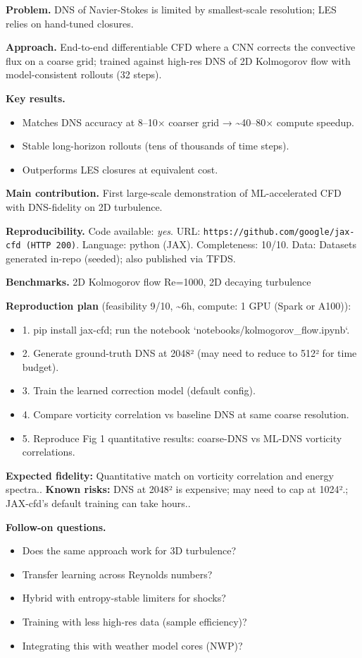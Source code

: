 \documentclass[10pt,letterpaper]{article}
\begin{document}
\textbf{Problem.} DNS of Navier-Stokes is limited by smallest-scale resolution; LES relies on hand-tuned closures.

\textbf{Approach.} End-to-end differentiable CFD where a CNN corrects the convective flux on a coarse grid; trained against high-res DNS of 2D Kolmogorov flow with model-consistent rollouts (32 steps).

\textbf{Key results.}
\begin{itemize}
\item Matches DNS accuracy at 8–10× coarser grid → \~{}40–80× compute speedup.
\item Stable long-horizon rollouts (tens of thousands of time steps).
\item Outperforms LES closures at equivalent cost.
\end{itemize}

\textbf{Main contribution.} First large-scale demonstration of ML-accelerated CFD with DNS-fidelity on 2D turbulence.

\textbf{Reproducibility.} Code available: \emph{yes}. URL: \texttt{https://github.com/google/jax-cfd (HTTP 200)}. Language: python (JAX). Completeness: 10/10. Data: Datasets generated in-repo (seeded); also published via TFDS.

\textbf{Benchmarks.} 2D Kolmogorov flow Re=1000, 2D decaying turbulence

\textbf{Reproduction plan} (feasibility 9/10, \textasciitilde6h, compute: 1 GPU (Spark or A100)):
\begin{itemize}
\item 1. pip install jax-cfd; run the notebook `notebooks/kolmogorov\_flow.ipynb`.
\item 2. Generate ground-truth DNS at 2048² (may need to reduce to 512² for time budget).
\item 3. Train the learned correction model (default config).
\item 4. Compare vorticity correlation vs baseline DNS at same coarse resolution.
\item 5. Reproduce Fig 1 quantitative results: coarse-DNS vs ML-DNS vorticity correlations.
\end{itemize}
\textbf{Expected fidelity:} Quantitative match on vorticity correlation and energy spectra.. \textbf{Known risks:} DNS at 2048² is expensive; may need to cap at 1024².; JAX-cfd's default training can take hours..

\textbf{Follow-on questions.}
\begin{itemize}
\item Does the same approach work for 3D turbulence?
\item Transfer learning across Reynolds numbers?
\item Hybrid with entropy-stable limiters for shocks?
\item Training with less high-res data (sample efficiency)?
\item Integrating this with weather model cores (NWP)?
\end{itemize}
\end{document}
